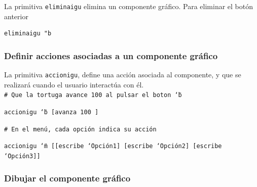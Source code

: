 La primitiva \texttt{eliminaigu} 
elimina un componente gr\'afico. Para eliminar el bot\'on anterior
\begin{verbatim}
eliminaigu "b \end{verbatim}

\subsubsection{Definir acciones asociadas a un componente gr\'afico}

La primitiva \texttt{accionigu}, 
define una acci\'on asociada al componente, y que se realizar\'a cuando el
usuario interact\'ua con \'el. \\

\noindent \texttt{\# Que la tortuga avance 100 al pulsar el boton \char`\"{}b}

\noindent \texttt{accionigu \char`\"{}b [avanza 100 ]}

\noindent \texttt{\# En el men\'u, cada opci\'on indica su acci\'on}

\noindent \texttt{accionigu \char`\"{}m [[escribe \char`\"{}Opci\'on1]
  [escribe \char`\"{}Opci\'on2] [escribe \char`\"{}Opci\'on3]]} 

\subsubsection{Dibujar el componente gr\'afico}


